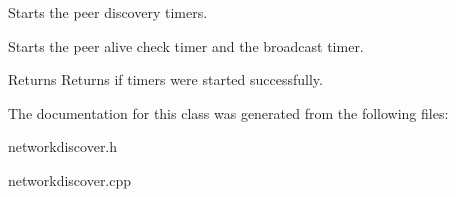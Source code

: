\-Starts the peer discovery timers. 

\-Starts the peer alive check timer and the broadcast timer. \begin{DoxyReturn}{\-Returns}
\-Returns if timers were started successfully. 
\end{DoxyReturn}


\-The documentation for this class was generated from the following files\-:\begin{DoxyCompactItemize}
\item 
networkdiscover.\-h\item 
networkdiscover.\-cpp\end{DoxyCompactItemize}
